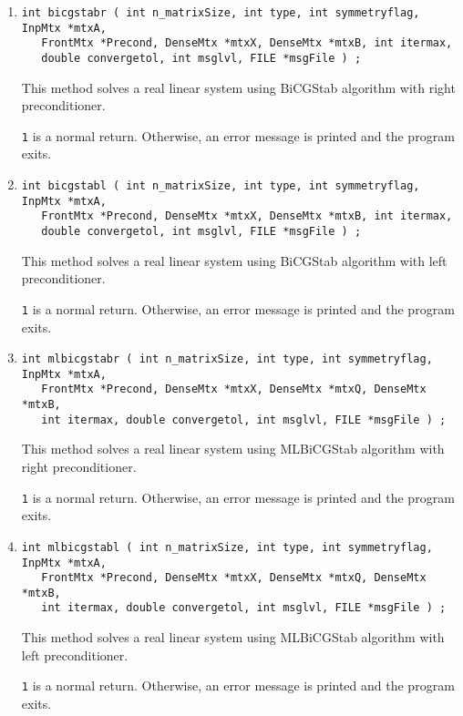 \begin{enumerate}
\item
\begin{verbatim}
int bicgstabr ( int n_matrixSize, int type, int symmetryflag, InpMtx *mtxA,
   FrontMtx *Precond, DenseMtx *mtxX, DenseMtx *mtxB, int itermax,
   double convergetol, int msglvl, FILE *msgFile ) ;
\end{verbatim}
\par
This method solves a real linear system using BiCGStab algorithm with right 
preconditioner. 
\par {}
{\tt 1} is a normal return.  Otherwise, an error message is printed and 
the program exits.


\item
\begin{verbatim}
int bicgstabl ( int n_matrixSize, int type, int symmetryflag, InpMtx *mtxA,
   FrontMtx *Precond, DenseMtx *mtxX, DenseMtx *mtxB, int itermax,
   double convergetol, int msglvl, FILE *msgFile ) ; 
\end{verbatim}
\par
This method solves a real linear system using BiCGStab algorithm with left 
preconditioner. 
\par {}
{\tt 1} is a normal return.  Otherwise, an error message is printed and 
the program exits.

\item
\begin{verbatim}
int mlbicgstabr ( int n_matrixSize, int type, int symmetryflag, InpMtx *mtxA,
   FrontMtx *Precond, DenseMtx *mtxX, DenseMtx *mtxQ, DenseMtx *mtxB,
   int itermax, double convergetol, int msglvl, FILE *msgFile ) ;
\end{verbatim}
\par
This method solves a real linear system using MLBiCGStab algorithm with right 
preconditioner. 
\par {}
{\tt 1} is a normal return.  Otherwise, an error message is printed and 
the program exits.

\item
\begin{verbatim}
int mlbicgstabl ( int n_matrixSize, int type, int symmetryflag, InpMtx *mtxA,
   FrontMtx *Precond, DenseMtx *mtxX, DenseMtx *mtxQ, DenseMtx *mtxB,
   int itermax, double convergetol, int msglvl, FILE *msgFile ) ;
\end{verbatim}
\par
This method solves a real linear system using MLBiCGStab algorithm with left 
preconditioner. 
\par {}
{\tt 1} is a normal return.  Otherwise, an error message is printed and 
the program exits.


\end{enumerate}
